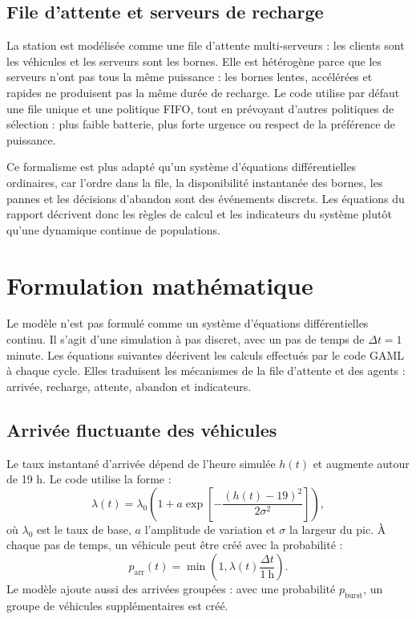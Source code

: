 \documentclass[11pt]{article}
\begin{document}
\subsection{File d'attente et serveurs de recharge}

La station est modélisée comme une file d'attente multi-serveurs : les clients sont les véhicules et les serveurs sont les bornes. Elle est hétérogène parce que les serveurs n'ont pas tous la même puissance : les bornes lentes, accélérées et rapides ne produisent pas la même durée de recharge. Le code utilise par défaut une file unique et une politique FIFO, tout en prévoyant d'autres politiques de sélection : plus faible batterie, plus forte urgence ou respect de la préférence de puissance.

Ce formalisme est plus adapté qu'un système d'équations différentielles ordinaires, car l'ordre dans la file, la disponibilité instantanée des bornes, les pannes et les décisions d'abandon sont des événements discrets. Les équations du rapport décrivent donc les règles de calcul et les indicateurs du système plutôt qu'une dynamique continue de populations.
\newpage
\section{Formulation mathématique}\label{sec:formulation}

Le modèle n'est pas formulé comme un système d'équations différentielles continu. Il s'agit d'une simulation à pas discret, avec un pas de temps de $\Delta t = 1$ minute. Les équations suivantes décrivent les calculs effectués par le code GAML à chaque cycle. Elles traduisent les mécanismes de la file d'attente et des agents : arrivée, recharge, attente, abandon et indicateurs.

\subsection{Arrivée fluctuante des véhicules}

Le taux instantané d'arrivée dépend de l'heure simulée $h(t)$ et augmente autour de 19 h. Le code utilise la forme :
\[
\lambda(t) = \lambda_0 \left(1 + a \exp\left[-\frac{(h(t)-19)^2}{2\sigma^2}\right]\right),
\]
où $\lambda_0$ est le taux de base, $a$ l'amplitude de variation et $\sigma$ la largeur du pic. À chaque pas de temps, un véhicule peut être créé avec la probabilité :
\[
p_{\mathrm{arr}}(t)=\min\left(1,\lambda(t)\frac{\Delta t}{1\ \mathrm{h}}\right).
\]
Le modèle ajoute aussi des arrivées groupées : avec une probabilité $p_{\mathrm{burst}}$, un groupe de véhicules supplémentaires est créé.
\end{document}
